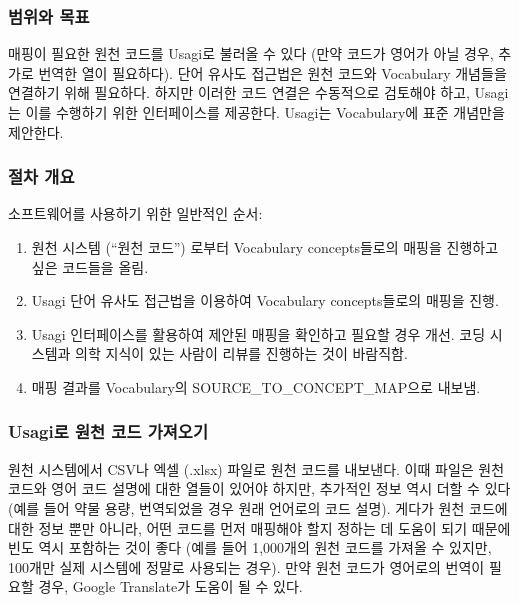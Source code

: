 \documentclass[11pt]{book}
\providecommand{\tightlist}{%
  \setlength{\itemsep}{0pt}\setlength{\parskip}{0pt}}
\theoremstyle{definition}
\theoremstyle{definition}
\theoremstyle{definition}
\theoremstyle{remark}
\begin{document}
\subsubsection*{범위와 목표}\label{--2}

매핑이 필요한 원천 코드를 Usagi로 불러올 수 있다 (만약 코드가 영어가
아닐 경우, 추가로 번역한 열이 필요하다). 단어 유사도 접근법은 원천
코드와 Vocabulary 개념들을 연결하기 위해 필요하다. 하지만 이러한 코드
연결은 수동적으로 검토해야 하고, Usagi는 이를 수행하기 위한 인터페이스를
제공한다. Usagi는 Vocabulary에 표준 개념만을 제안한다.

\subsubsection*{절차 개요}\label{--2}

소프트웨어를 사용하기 위한 일반적인 순서:

\begin{enumerate}
\def\labelenumi{\arabic{enumi}.}
\tightlist
\item
  원천 시스템 (``원천 코드'') 로부터 Vocabulary concepts들로의 매핑을
  진행하고 싶은 코드들을 올림.
\item
  Usagi 단어 유사도 접근법을 이용하여 Vocabulary concepts들로의 매핑을
  진행.
\item
  Usagi 인터페이스를 활용하여 제안된 매핑을 확인하고 필요할 경우 개선.
  코딩 시스템과 의학 지식이 있는 사람이 리뷰를 진행하는 것이 바람직함.
\item
  매핑 결과를 Vocabulary의 SOURCE\_TO\_CONCEPT\_MAP으로 내보냄.
\end{enumerate}

\subsubsection{Usagi로 원천 코드 가져오기}\label{usagi---}

원천 시스템에서 CSV나 엑셀 (.xlsx) 파일로 원천 코드를 내보낸다. 이때
파일은 원천 코드와 영어 코드 설명에 대한 열들이 있어야 하지만, 추가적인
정보 역시 더할 수 있다 (예를 들어 약물 용량, 번역되었을 경우 원래
언어로의 코드 설명). 게다가 원천 코드에 대한 정보 뿐만 아니라, 어떤
코드를 먼저 매핑해야 할지 정하는 데 도움이 되기 때문에 빈도 역시
포함하는 것이 좋다 (예를 들어 1,000개의 원천 코드를 가져올 수 있지만,
100개만 실제 시스템에 정말로 사용되는 경우). 만약 원천 코드가 영어로의
번역이 필요할 경우, Google Translate가 도움이 될 수 있다.
\end{document}
